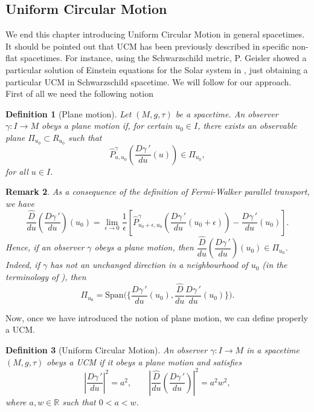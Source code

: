 \documentclass[11pt]{book}
\newtheorem{defi}{Definition}[chapter]
\newtheorem{rem}[defi]{Remark}
\def\R{\mathbb R}
\begin{document}
\subsection{Uniform Circular Motion}
We end this chapter introducing Uniform Circular Motion in general spacetimes. It should be pointed out that UCM has been previously described in specific non-flat spacetimes. For instance, using the Schwarzschild metric, P. Geisler showed a particular solution of Einstein equations for the Solar system in \cite{Geisler}, just obtaining a particular UCM in Schwarzschild spacetime. We will follow \cite{UCM} for our approach. First of all we need the following notion
\begin{defi}[Plane motion]\label{plane motion}
	Let $(M,g,\tau)$ be a spacetime. An observer $\gamma:I\to M$ obeys a plane motion if, for certain $u_0\in I$, there exists an observable plane $\Pi_{u_0}\subset R_{u_0}$ such that 
	\begin{equation}
		\widehat{P}_{u,u_0}^\gamma\left(\dfrac{D\gamma{\,'}}{du}(u)\right) \in \Pi_{u_0},
	\end{equation}
for all $u\in I$.
\end{defi}

\begin{rem}
	{\rm
		As a consequence of the definition of Fermi-Walker parallel transport, we have
		\[
		\dfrac{\widehat{D}}{du}\left(\dfrac{D\gamma{\,'}}{du}\right)(u_0)=\lim_{\epsilon \to 0}\dfrac{1}{\epsilon}\left[\widehat{P}_{u_0+\epsilon,u_0}^\gamma\left( \dfrac{D\gamma{\,'}}{du}(u_0+\epsilon)\right) - \dfrac{D\gamma{\,'}}{du}(u_0)\right].
		\]
		Hence, if an observer $\gamma$ obeys a plane motion, then  $\dfrac{\widehat{D}}{du}\left(\dfrac{D\gamma{\,'}}{du}\right)(u_0)\in \Pi_{u_0}$. Indeed, if $\gamma$ has not an unchanged direction in a neighbourhood of $u_0$ (in the terminology of \cite{UDM}), then
		\[
		\Pi_{u_0}=\textrm{Span}\Big( \Big\lbrace  \dfrac{D\gamma{\,'}}{du}(u_0), \dfrac{\widehat{D}}{du}\dfrac{D\gamma{\,'}}{du}(u_0)\Big\rbrace \Big).
		\] }
\end{rem}

Now, once we have introduced the notion of plane motion, we can define properly a UCM.
\begin{defi}[Uniform Circular Motion]\label{UCM definition} An observer $\gamma:I\to M$ in a spacetime $(M,g,\tau)$ obeys
	 a UCM if it obeys a plane motion and satisfies
	\begin{equation}\label{UCM}
		\left|\dfrac{D\gamma{\,'}}{du}\right|^2=a^2,\quad \quad \left| \dfrac{\widehat{D}}{du}\left(\dfrac{D\gamma{\,'}}{du}\right)\right|^2=a^2 w^2,
	\end{equation}
	where $a,w\in \R$ such that $0<a<w$.
\end{defi}
\end{document}
